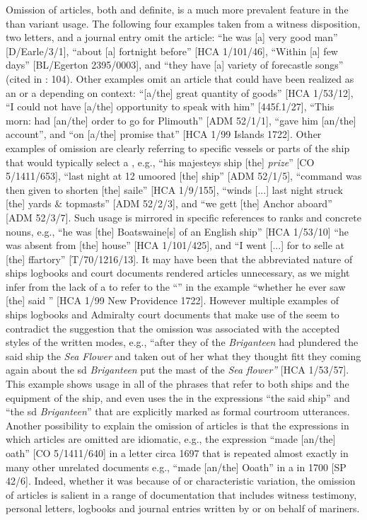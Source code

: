 Omission of articles, both  and definite, is a much more prevalent feature in the  than variant usage. The following four examples taken from a witness disposition, two letters, and a journal entry omit the  article: “he was [a] very good man” [D/Earle/3/1], “about [a] fortnight before” [HCA 1/101/46], “Within [a] few days” [BL/Egerton 2395/0003], and “they have [a] variety of forecastle songs” (cited in \citealt{Palmer1986}: 104). Other examples omit an article that could have been realized as an  or a  depending on context: “[a/the] great quantity of goods” [HCA 1/53/12], “I could not have [a/the] opportunity to speak with him” [445f.1/27], “This morn: had [an/the] order to go for Plimouth” [ADM 52/1/1], “gave him [an/the] account”, and “on [a/the] promise that” [HCA 1/99  Islands 1722]. Other examples of omission are clearly referring to specific vessels or parts of the ship that would typically select a , e.g., “his majesteys ship [the] \textit{ prize}” [CO 5/1411/653], “last night at 12 umoored [the] ship” [ADM 52/1/5], “command was then given to shorten [the] saile” [HCA 1/9/155], “winds [...] last night struck [the] yards \& topmasts” [ADM 52/2/3], and “we gett [the] Anchor aboard” [ADM 52/3/7]. Such usage is mirrored in specific references to ranks and concrete nouns, e.g., “he was [the] Boatswaine[s]  of an English ship” [HCA 1/53/10] “he was absent from [the] house” [HCA 1/101/425], and “I went [...] for to selle at [the] ffartory” [T/70/1216/13]. It may have been that the abbreviated nature of ships logbooks and court documents rendered articles unnecessary, as we might infer from the lack of a  to refer to the “” in the example “whether he ever saw [the] said ” [HCA 1/99 New Providence 1722]. However multiple examples of ships logbooks and Admiralty court documents that make use of the  seem to contradict the suggestion that the omission was associated with the accepted styles of the written modes, e.g., “after they of the \textit{Briganteen} had plundered the said ship the \textit{Sea Flower} and taken out of her what they thought fitt they coming again about the sd \textit{Briganteen} put the mast of the \textit{Sea flower”} [HCA 1/53/57]. This example shows  usage in all of the phrases that refer to both ships and the equipment of the ship, and even uses the  in the expressions “the said ship” and “the sd \textit{Briganteen}” that are explicitly marked as formal courtroom utterances. Another possibility to explain the omission of articles is that the expressions in which articles are omitted are idiomatic, e.g., the expression “made [an/the] oath” [CO 5/1411/640] in a letter circa 1697 that is repeated almost exactly in many other unrelated documents e.g., “made [an/the] Ooath” in a  in 1700 [SP 42/6]. Indeed, whether it was because of  or characteristic variation, the omission of articles is salient in a range of documentation that includes witness testimony, personal letters, logbooks and journal entries written by or on behalf of mariners. 

